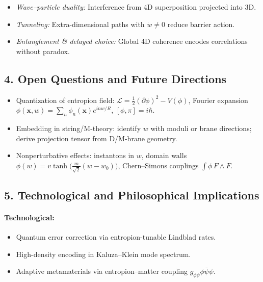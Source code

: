 \documentclass[12pt]{article}
\begin{document}
\begin{itemize}
  \item \emph{Wave–particle duality:} Interference from 4D superposition projected into 3D.  
  \item \emph{Tunneling:} Extra-dimensional paths with \(\dot w\neq0\) reduce barrier action.  
  \item \emph{Entanglement \& delayed choice:} Global 4D coherence encodes correlations without paradox.
\end{itemize}

\subsection*{4. Open Questions and Future Directions}

\begin{itemize}
  \item Quantization of entropion field:  
    \(\mathcal{L}=\tfrac12(\partial\phi)^2 - V(\phi)\), Fourier expansion  
    \(\phi(\mathbf{x},w)=\sum_n\phi_n(\mathbf{x})e^{i n w/R}\),  
    \([\phi,\pi]=i\hbar\).  
  \item Embedding in string/M-theory: identify \(w\) with moduli or brane directions; derive projection tensor from D/M-brane geometry.  
  \item Nonperturbative effects: instantons in \(w\), domain walls  
    \(\phi(w)=v\tanh\bigl(\tfrac{m}{\sqrt2}(w-w_0)\bigr)\), Chern–Simons couplings \(\int\phi\,F\wedge F\).
\end{itemize}

\subsection*{5. Technological and Philosophical Implications}

\paragraph{Technological:}
\begin{itemize}
  \item Quantum error correction via entropion-tunable Lindblad rates.  
  \item High-density encoding in Kaluza–Klein mode spectrum.  
  \item Adaptive metamaterials via entropion–matter coupling \(g_{\phi\psi}\phi\bar\psi\psi\).
\end{itemize}
\end{document}
